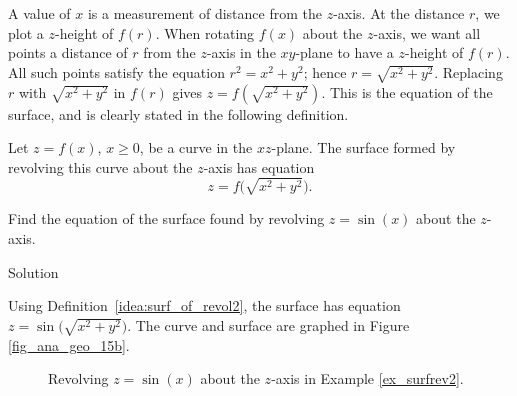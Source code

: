 A value of $x$ is a measurement of distance from the $z$-axis. At the distance $r$, we plot a $z$-height of $f(r)$. When rotating $f(x)$ about the $z$-axis, we want all points a distance of $r$ from the $z$-axis in the $xy$-plane to have a $z$-height of $f(r)$. All such points satisfy the equation $r^2=x^2+y^2$; hence $r=\sqrt{x^2+y^2}$. Replacing $r$ with $\sqrt{x^2+y^2}$ in $f(r)$ gives $z=f(\sqrt{x^2+y^2})$. This is the equation of the surface, and is clearly stated in the following definition. 

\begin{definition}\label{idea:surf_of_revol2}
Let $z=f(x)$, $x\geq 0$, be a curve in the $xz$-plane. The surface formed by revolving this curve about the $z$-axis has equation $$z=f\big(\sqrt{x^2+y^2}\big).$$
\end{definition}


\begin{example}\label{ex_surfrev2}
Find the equation of the surface found by revolving $z=\sin(x)$ about the $z$-axis.

Solution 

Using Definition~\ref{idea:surf_of_revol2}, the surface has equation $z=\sin\big(\sqrt{x^2+y^2}\big)$. The curve and surface are graphed in Figure \ref{fig_ana_geo_15b}.

\begin{figure}[H]
\centering
\centerline{
\hspace{0.1cm}
}
\caption{Revolving $z=\sin(x)$ about the $z$-axis in Example \ref{ex_surfrev2}.}
\end{figure}


\end{example}


